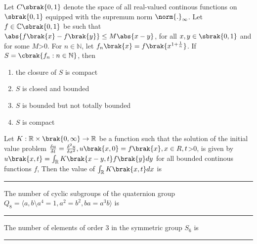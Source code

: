 \item{
Let $C\sbrak{0,1}$ denote the space of all real-valued continous functions on $\sbrak{0,1}$ equipped with the supremum norm $\norm{.}_{\infty}$. Let $f\in\mathbb{C}\sbrak{0,1}$ be such that $\abs{f\brak{x}-f\brak{y}}\leq M\abs{x-y}$, for all $x,y\in\sbrak{0,1}$ and for some $M$\textgreater$0$. For $n\in\mathbb{N}$, let $f_n\brak{x}=f\brak{x^{1+\frac{1}{n}}}$. If $S=\cbrak{f_n:n\in\mathbb{N}}$, then 
\begin{multicols}{2}
\begin{enumerate}
\item the closure of $S$ is compact
\item $S$ is closed and bounded
\item $S$ is bounded but not totally bounded
\item $S$ is compact
\end{enumerate}
\end{multicols}
}
\item{
Let $K:\mathbb{R}\times\brak{0,\infty}\rightarrow\mathbb{R}$ be a function such that the solution of the initial value problem $\frac{\delta u}{\delta t}=\frac{\delta^2u}{\delta x^2},u\brak{x,0}=f\brak{x},x\in R,t$\textgreater$0$, is given by $u\brak{x,t}=\int_\mathbb{R}K\brak{x-y,t}f\brak{y}dy$ for all bounded continous functions $f$, Then the value of $\int_\mathbb{R}K\brak{x,t}dx$ is \rule{2cm}{0.15mm}
}
\item{
The number of cyclic subgroups of the quaternion group $Q_8=\langle a,b\text{\textbackslash}a^4=1,a^2=b^2,ba=a^3b\rangle$ is \rule{2cm}{0.15mm}
}
\item{
The number of elements of order $3$ in the symmetric group $S_6$ is \rule{2cm}{0.15mm}
}
